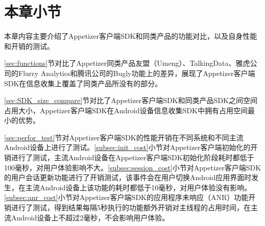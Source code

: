 \section{本章小节}

本章内容主要介绍了Appetizer客户端SDK和同类产品的功能对比，以及自身性能和开销的测试。

\ref{sec:functions}节对比了Appetizer同类产品友盟（Umeng）、TalkingData、雅虎公司的Flurry Analytics和腾讯公司的Bugly功能上的差异，展现了Appetizer客户端SDK在信息收集上覆盖了同类产品所没有的部分。

\ref{sec:SDK_size_compare}节对比了Appetizer客户端SDK和同类产品SDK之间空间占用大小，Appetizer客户端SDK在Android设备信息收集SDK中拥有占用空间最小的优势。

\ref{sec:perfor_test}节对Appetizer客户端SDK的性能开销在不同系统和不同主流Android设备上进行了测试。\ref{subsec:init_cost}小节对Appetizer客户端初始化的开销进行了测试，主流Android设备在Appetizer客户端SDK初始化阶段耗时都低于100毫秒，对用户体验影响不大。\ref{subsec:session_cost}小节对Appetizer客户端SDK的用户会话更新功能进行了开销测试，该事件会在用户切换Android应用界面时发生，在主流Android设备上该功能的耗时都低于10毫秒，对用户体验没有影响。\ref{subsec:anr_cost}小节对Appetizer客户端SDK的应用程序未响应（ANR）功能开销进行了测试，得到结果每隔5秒执行的功能额外开销对主线程的占用时间，在主流Android设备上不超过2毫秒，不会影响用户体验。

